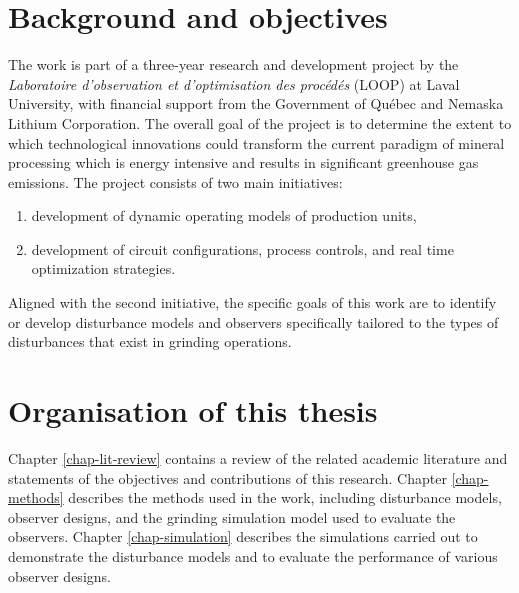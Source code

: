 
\section*{Background and objectives}

The work is part of a three-year research and development project by the \textit{Laboratoire d’observation et d’optimisation des procédés} (LOOP) at Laval University, with financial support from the Government of Qu\'ebec and Nemaska Lithium Corporation. The overall goal of the project is to determine the extent to which technological innovations could transform the current paradigm of mineral processing which is energy intensive and results in significant greenhouse gas emissions. The project consists of two main initiatives:

\begin{enumerate}
	\item development of dynamic operating models of production units,
	\item development of circuit configurations, process controls, and real time optimization strategies.
\end{enumerate}

Aligned with the second initiative, the specific goals of this work are to identify or develop disturbance models and observers specifically tailored to the types of disturbances that exist in grinding operations.

\section*{Organisation of this thesis}

Chapter \ref{chap-lit-review} contains a review of the related academic literature and statements of the objectives and contributions of this research. Chapter \ref{chap-methods} describes the methods used in the work, including disturbance models, observer designs, and the grinding simulation model used to evaluate the observers. Chapter \ref{chap-simulation} describes the simulations carried out to demonstrate the disturbance models and to evaluate the performance of various observer designs.

